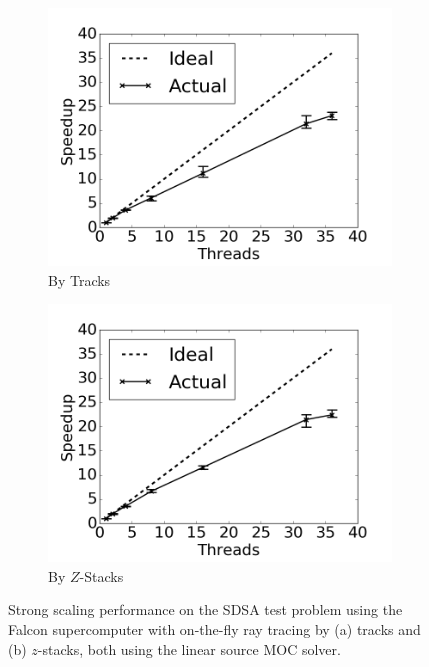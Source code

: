 \begin{figure}[h!]
	\centering
	\begin{subfigure}{0.48\textwidth}
		\centering
		\includegraphics[width=\linewidth]{figures/results/performance/ls-parallel-scaling-tracks.png}
		\caption{By Tracks}
		\label{fig:rt-parallel-ls-tracks}
	\end{subfigure}
	\begin{subfigure}{0.48\textwidth}
		\centering
		\includegraphics[width=\linewidth]{figures/results/performance/ls-parallel-scaling-stacks.png}
		\caption{By $Z$-Stacks}
		\label{fig:rt-parallel-ls-stacks}
	\end{subfigure}
	\caption[]{Strong scaling performance on the SDSA test problem using the Falcon supercomputer with on-the-fly ray tracing by (a) tracks and (b) $z$-stacks, both using the linear source \ac{MOC} solver.}
	\label{fig:rt-parallel-ls}
\end{figure}

